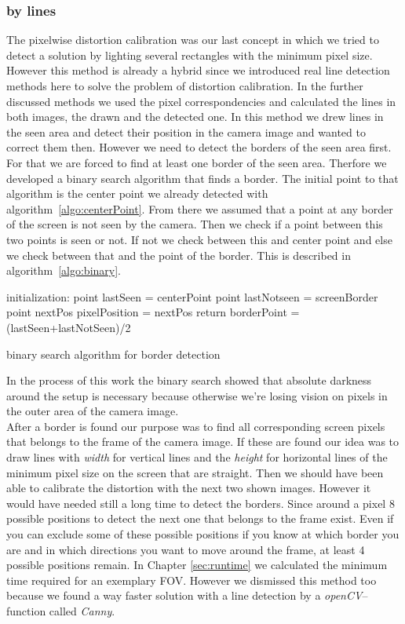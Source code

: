 \documentclass[journal,final,a4paper,twoside]{PS}
\begin{document}
\subsubsection{by lines}
The pixelwise distortion calibration was our last concept in which we tried to detect a solution by lighting several rectangles with the minimum pixel size. However this method is already a hybrid since we introduced real line detection methods here to solve the problem of distortion calibration. In the further discussed methods we used the pixel correspondencies and calculated the lines in both images, the drawn and the detected one. In this method we drew lines in the seen area and detect their position in the camera image and wanted to correct them then. However we need to detect the borders of the seen area first. For that we are forced to find at least one border of the seen area. Therfore we developed a binary search algorithm that finds a border. The initial point to that algorithm is the center point we already detected with algorithm~\ref{algo:centerPoint}. From there we assumed that a point at any border of the screen is not seen by the camera. Then we check if a point between this two points is seen or not. If not we check between this and center point and else we check between that and the point of the border. This is described in algorithm~\ref{algo:binary}. 


\begin{algorithm}[h]
 initialization: \;
 point lastSeen = centerPoint\;
 point lastNotseen = screenBorder\;
 point nextPos\;
 pixelPosition = nextPos\;
 return borderPoint = (lastSeen+lastNotSeen)/2\;
 \caption{binary search algorithm for border detection}
 \label{algo:binary}
\end{algorithm} 
In the process of this work the binary search showed that absolute darkness around the setup is necessary because otherwise we're losing vision on pixels in the outer area of the camera image. \\After a border is found our purpose was to find all corresponding screen pixels that belongs to the frame of the camera image. If these are found our idea was to draw lines with \emph{width} for vertical lines and the \emph{height} for horizontal lines of the minimum pixel size on the screen that are straight. Then we should have been able to calibrate the distortion with the next two shown images. However it would have needed still a long time to detect the borders. Since around a pixel 8 possible positions to detect the next one that belongs to the frame exist. Even if you can exclude some of these possible positions if you know at which border you are and in which directions you want to move around the frame, at least 4 possible positions remain. %
In Chapter \ref{sec:runtime} we calculated the minimum time required for an exemplary FOV. However we dismissed this method too because we found a way faster solution with a line detection by a \emph{openCV}--function called \emph{Canny}. 
\end{document}
